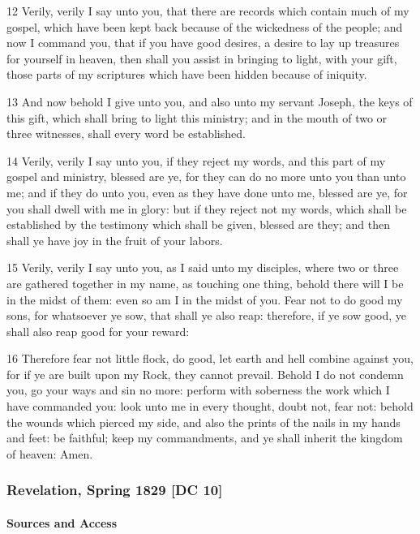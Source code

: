 				12 Verily, verily I say unto you, that there are records which contain much of my gospel, which have been kept back because of the wickedness of the people; and now I command you, that if you have good desires, a desire to lay up treasures for yourself in heaven, then shall you assist in bringing to light, with your gift, those parts of my scriptures which have been hidden because of iniquity.

				13 And now behold I give unto you, and also unto my servant Joseph, the keys of this gift, which shall bring to light this ministry; and in the mouth of two or three witnesses, shall every word be established.

				14 Verily, verily I say unto you, if they reject my words, and this part of my gospel and ministry, blessed are ye, for they can do no more unto you than unto me; and if they do unto you, even as they have done unto me, blessed are ye, for you shall dwell with me in glory: but if they reject not my words, which shall be established by the testimony which shall be given, blessed are they; and then shall ye have joy in the fruit of your labors.

				15 Verily, verily I say unto you, as I said unto my disciples, where two or three are gathered together in my name, as touching one thing, behold there will I be in the midst of them: even so am I in the midst of you. Fear not to do good my sons, for whatsoever ye sow, that shall ye also reap: therefore, if ye sow good, ye shall also reap good for your reward:

				16 Therefore fear not little flock, do good, let earth and hell combine against you, for if ye are built upon my Rock, they cannot prevail. Behold I do not condemn you, go your ways and sin no more: perform with soberness the work which I have commanded you: look unto me in every thought, doubt not, fear not: behold the wounds which pierced my side, and also the prints of the nails in my hands and feet: be faithful; keep my commandments, and ye shall inherit the kingdom of heaven: Amen.
			
		\subsubsection{Revelation, Spring 1829 [DC 10]}
			\label{EMS-1828-1829-JS-SPR-1829}
			
			\paragraph{Sources and Access}

